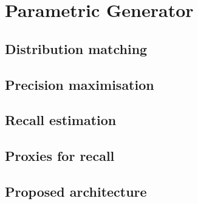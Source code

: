 \documentclass[../../main.tex]{subfiles}
\begin{document}
\chapter{Parametric Generator}

\section{Distribution matching}

\section{Precision maximisation}

\section{Recall estimation}

\section{Proxies for recall}

\section{Proposed architecture}
\end{document}
